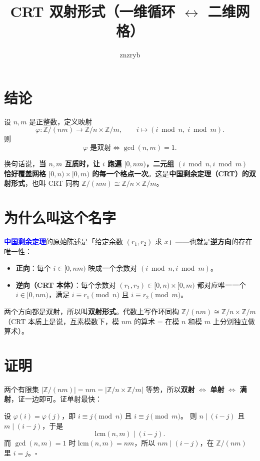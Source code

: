 \documentclass{article}
\title{CRT 双射形式（一维循环 $\leftrightarrow$ 二维网格）}
\author{znzryb}
\date{}
\begin{document}
\maketitle

\section{结论}

设 $n, m$ 是正整数，定义映射
$$\varphi: \mathbb{Z}/(nm) \longrightarrow \mathbb{Z}/n \times \mathbb{Z}/m, \qquad i \longmapsto (i \bmod n,\; i \bmod m).$$
则
$$\varphi \text{ 是双射} \iff \gcd(n, m) = 1.$$

换句话说，\textbf{当 $n, m$ 互质时，让 $i$ 跑遍 $[0, nm)$，二元组 $(i \bmod n, i \bmod m)$ 恰好覆盖网格 $[0, n) \times [0, m)$ 的每一个格点一次}。这是\textbf{中国剩余定理（CRT）的双射形式}，也叫 CRT 同构 $\mathbb{Z}/(nm) \cong \mathbb{Z}/n \times \mathbb{Z}/m$。

\section{为什么叫这个名字}

\textcolor{blue}{\textbf{中国剩余定理}}的原始陈述是「给定余数 $(r_1, r_2)$ 求 $x$」——也就是\textbf{逆方向}的存在唯一性：

\begin{itemize}
    \item \textbf{正向}：每个 $i \in [0, nm)$ 映成一个余数对 $(i \bmod n, i \bmod m)$。
    \item \textbf{逆向（CRT 本体）}：每个余数对 $(r_1, r_2) \in [0, n) \times [0, m)$ 都对应唯一一个 $i \in [0, nm)$，满足 $i \equiv r_1 \pmod n$ 且 $i \equiv r_2 \pmod m$。
\end{itemize}

两个方向都是双射，所以叫\textbf{双射形式}。代数上写作环同构 $\mathbb{Z}/(nm) \cong \mathbb{Z}/n \times \mathbb{Z}/m$（CRT 本质上是说，互素模数下，模 $nm$ 的算术 = 在模 $n$ 和模 $m$ 上分别独立做算术）。

\section{证明}

两个有限集 $|\mathbb{Z}/(nm)| = nm = |\mathbb{Z}/n \times \mathbb{Z}/m|$ 等势，所以\textbf{双射} $\iff$ \textbf{单射} $\iff$ \textbf{满射}，证一边即可。证单射最快：

设 $\varphi(i) = \varphi(j)$，即 $i \equiv j \pmod n$ 且 $i \equiv j \pmod m$。
则 $n \mid (i - j)$ 且 $m \mid (i - j)$，于是
$$\mathrm{lcm}(n, m) \mid (i - j).$$
而 $\gcd(n, m) = 1$ 时 $\mathrm{lcm}(n, m) = nm$，所以 $nm \mid (i - j)$，在 $\mathbb{Z}/(nm)$ 里 $i = j$。$\square$
\end{document}
